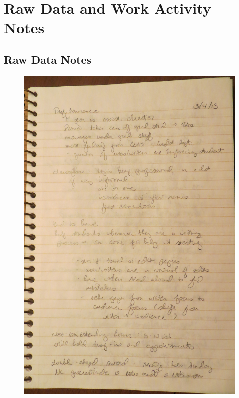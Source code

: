 \documentclass[12pt]{article} %
\begin{document}
\section{Raw Data and Work Activity Notes} %
  \subsection*{Raw Data Notes}
  
  \begin{figure}[H]
  \centering
  \includegraphics[width=0.75\linewidth]{RAZ_raw_notes1}
  \caption{}
  \label{fig:rn1}
  \end{figure}
\end{document}
